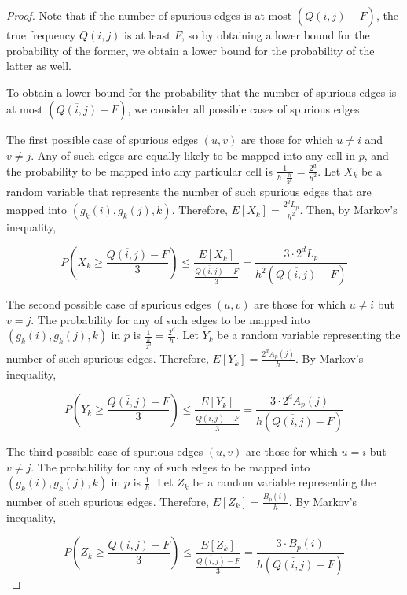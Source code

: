 \begin{proof}
Note that if the number of spurious edges is at most $(\overline{Q(i,j)} - F)$, the true frequency $Q(i,j)$ is at least $F$, so by obtaining a lower bound for the probability of the former, we obtain a lower bound for the probability of the latter as well.

To obtain a lower bound for the probability that the number of spurious edges is at most $(\overline{Q(i,j)} - F)$, we consider all possible cases of spurious edges.

The first possible case of spurious edges $(u,v)$ are those for which $u \neq i$ and $v \neq j$. Any of such edges are equally likely to be mapped into any cell in $p$, and the probability to be mapped into any particular cell is $\frac{1}{h \cdot \frac{h}{2^d}} = \frac{2^d}{h^2}$. Let $X_k$ be a random variable that represents the number of such spurious edges that are mapped into $(g_k(i),g_k(j),k)$. Therefore, $E[X_k] = \frac{2^dL_p}{h^2}$. Then, by Markov's inequality,

\begin{equation} \label{hh1}
P(X_k \geq \frac{\overline{Q(i,j)}-F}{3}) \leq \frac{E[X_k]}{\frac{\overline{Q(i,j)}-F}{3}} = \frac{3\cdot2^dL_p}{h^2(\overline{Q(i,j)}-F)}
\end{equation}

The second possible case of spurious edges $(u,v)$ are those for which $u \neq i$ but $v=j$. The probability for any of such edges to be mapped into $(g_k(i),g_k(j),k)$ in $p$ is $\frac{1}{\frac{h}{2^d}} = \frac{2^d}{h}$. Let $Y_k$ be a random variable representing the number of such spurious edges. Therefore, $E[Y_k] = \frac{2^dA_p(j)}{h}$. By Markov's inequality,

\begin{equation} \label{hh2}
P(Y_k \geq \frac{\overline{Q(i,j)}-F}{3}) \leq \frac{E[Y_k]}{\frac{\overline{Q(i,j)}-F}{3}} = \frac{3\cdot2^dA_p(j)}{h(\overline{Q(i,j)}-F)}
\end{equation}

The third possible case of spurious edges $(u,v)$ are those for which $u=i$ but $v \neq j$. The probability for any of such edges to be mapped into $(g_k(i),g_k(j),k)$ in $p$ is $\frac{1}{h}$. Let $Z_k$ be a random variable representing the number of such spurious edges. Therefore, $E[Z_k] = \frac{B_p(i)}{h}$. By Markov's inequality,

\begin{equation} \label{hh3}
P(Z_k \geq \frac{\overline{Q(i,j)}-F}{3}) \leq \frac{E[Z_k]}{\frac{\overline{Q(i,j)}-F}{3}} = \frac{3\cdot B_p(i)}{h(\overline{Q(i,j)}-F)}
\end{equation}


\end{proof}
